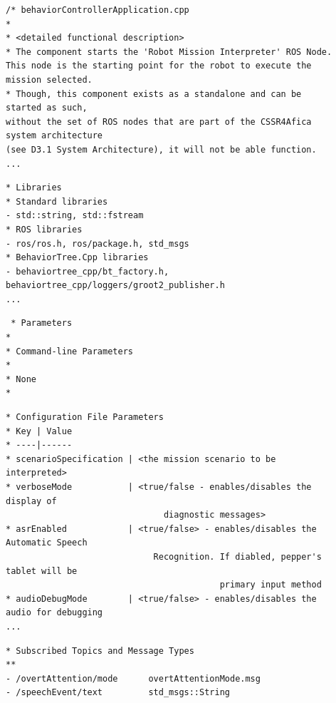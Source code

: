\documentclass{CSSRforAfrica}
\newcommand{\checkboxChecked}{\fbox{\ding{51}}} %
\begin{document}
\begin{description}

\item[\checkboxChecked] 
 {\small 
\begin{verbatim}
/* behaviorControllerApplication.cpp
* 
* <detailed functional description>
* The component starts the 'Robot Mission Interpreter' ROS Node. 
This node is the starting point for the robot to execute the mission selected.
* Though, this component exists as a standalone and can be started as such, 
without the set of ROS nodes that are part of the CSSR4Afica system architecture
(see D3.1 System Architecture), it will not be able function.
...
\end{verbatim}}

\item[\checkboxChecked] 
 {\small 
\begin{verbatim}
* Libraries
* Standard libraries
- std::string, std::fstream
* ROS libraries
- ros/ros.h, ros/package.h, std_msgs
* BehaviorTree.Cpp libraries
- behaviortree_cpp/bt_factory.h, behaviortree_cpp/loggers/groot2_publisher.h
...
\end{verbatim}}

\item[\checkboxChecked] 
 {\small 
\begin{verbatim}
 * Parameters
*
* Command-line Parameters
*
* None
*
\end{verbatim}}


\item[\checkboxChecked] 
 {\small 
\begin{verbatim}
* Configuration File Parameters
* Key | Value
* ----|------
* scenarioSpecification | <the mission scenario to be interpreted>
* verboseMode           | <true/false - enables/disables the display of 
                               diagnostic messages>
* asrEnabled            | <true/false> - enables/disables the Automatic Speech 
                             Recognition. If diabled, pepper's tablet will be 
                                          primary input method
* audioDebugMode        | <true/false> - enables/disables the audio for debugging
...
\end{verbatim}}

\item[\checkboxChecked] 
 {\small 
\begin{verbatim}
* Subscribed Topics and Message Types
**
- /overtAttention/mode      overtAttentionMode.msg
- /speechEvent/text         std_msgs::String
\end{verbatim}}


\end{description}
\end{document}
